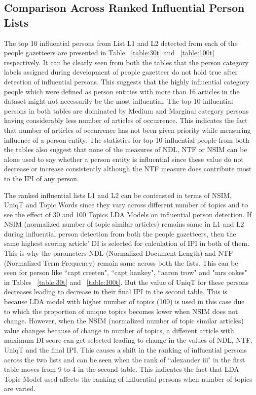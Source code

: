 \subsection{Comparison Across Ranked Influential Person Lists }

The top 10 influential persons from List L1 and L2 detected from each of the people gazetteers are presented in Table ~\ref{table:30t} and ~\ref{table:100t} respectively.
It can be clearly seen from both the tables that the person category labels assigned during development of people gazetteer do not hold true after detection of influential persons. This suggests that the highly influential category people which were defined as person entities with more than 16 articles in the dataset might not necessarily be the most influential. The top 10 influential persons in both tables are dominated by Medium and Marginal category persons having considerably less number of articles of occurrence. This indicates the fact that number of articles of occurrence has not been given priority while measuring influence of a person entity. 
The statistics for top 10 influential people from both the tables also suggest that none of the measures of NDL, NTF or NSIM can be alone used to say whether a person entity is influential since these value do not decrease or increase consistently although the NTF measure does contribute most to the IPI of any person.

The ranked influential lists L1 and L2 can be contrasted in terms of NSIM, UniqT and Topic Words since they vary across different number of topics and to see the effect of 30 and 100 Topics LDA Models on influential person detection.
 If NSIM (normalized number of topic similar articles) remains same in L1 and L2 during influential person detection from both the people gazetteers, then the same highest scoring article' DI is selected for calculation of IPI in both of them. This is why the parameters NDL (Normalized Document Length) and NTF (Normalized Term Frequency) remain same across both the lists. This can be seen for person like ``capt creeten", ``capt hankey", ``aaron trow" and "mrs oakes" in Tables ~\ref{table:30t} and ~\ref{table:100t}. But the value of UniqT for these persons decreases leading to decrease in their final IPI in the second table. This is because LDA model with higher number of topics (100) is used in this case due to which the proportion of unique topics becomes lower when NSIM does not change.
However, when the NSIM (normalized number of topic similar articles) value changes because of change in number of topics, a different article with maximum DI score can get selected leading to change in the values of NDL, NTF, UniqT and the final IPI. This causes a shift in the ranking of influential persons across the two lists and can be seen when the rank of ``alexander iii" in the first table moves from 9 to 4 in the second table. 
This indicates the fact that LDA Topic Model used affects the ranking of influential persons when number of topics are varied.

